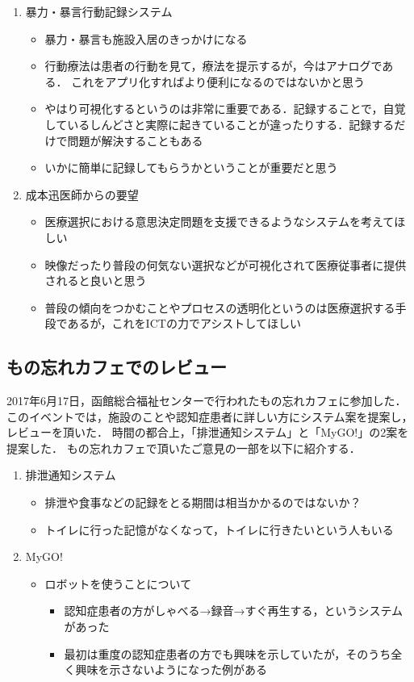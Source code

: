 \documentclass[../report]{subfiles}
\begin{document}
\begin{enumerate}
    \item[] 暴力・暴言行動記録システム
\begin{itemize}
    \item 暴力・暴言も施設入居のきっかけになる
    \item 行動療法は患者の行動を見て，療法を提示するが，今はアナログである．
これをアプリ化すればより便利になるのではないかと思う
    \item やはり可視化するというのは非常に重要である．記録することで，自覚しているしんどさと実際に起きていることが違ったりする．記録するだけで問題が解決することもある
    \item いかに簡単に記録してもらうかということが重要だと思う
\end{itemize}

    \item[] 成本迅医師からの要望
\begin{itemize}
    \item 医療選択における意思決定問題を支援できるようなシステムを考えてほしい
    \item 映像だったり普段の何気ない選択などが可視化されて医療従事者に提供されると良いと思う
    \item 普段の傾向をつかむことやプロセスの透明化というのは医療選択する手段であるが，これをICTの力でアシストしてほしい
\end{itemize}
\end{enumerate}

\subsection{もの忘れカフェでのレビュー} \label{sec:4_hyouka_monowasurecafe}
2017年6月17日，函館総合福祉センターで行われたもの忘れカフェに参加した．
このイベントでは，施設のことや認知症患者に詳しい方にシステム案を提案し，レビューを頂いた．
時間の都合上，「排泄通知システム」と「MyGO!」の2案を提案した．
もの忘れカフェで頂いたご意見の一部を以下に紹介する．

\begin{enumerate}
    \item[] 排泄通知システム
\begin{itemize}
    \item 排泄や食事などの記録をとる期間は相当かかるのではないか？
    \item トイレに行った記憶がなくなって，トイレに行きたいという人もいる
\end{itemize}

    \item[] MyGO!
\begin{itemize}
    \item ロボットを使うことについて
	\begin{itemize}
		\item 認知症患者の方がしゃべる→録音→すぐ再生する，というシステムがあった
		\item 最初は重度の認知症患者の方でも興味を示していたが，そのうち全く興味を示さないようになった例がある
	\end{itemize}
\end{itemize}
\end{enumerate}
\end{document}
